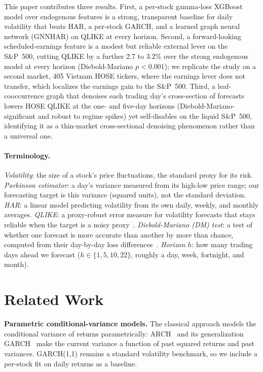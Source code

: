 \documentclass[runningheads]{llncs}
\begin{document}
This paper contributes three results. First, a per-stock gamma-loss XGBoost model over endogenous
features is a strong, transparent baseline for daily volatility that beats HAR, a per-stock
GARCH, and a learned graph neural network (GNNHAR) on QLIKE at every horizon. Second, a forward-looking
scheduled-earnings feature is a modest but reliable external lever on the S\&P~500, cutting QLIKE by a
further 2.7 to 3.2\% over the strong endogenous model at every horizon (Diebold-Mariano $p<0.001$); we
replicate the study on a second market, 405 Vietnam HOSE tickers, where the earnings lever does not
transfer, which localizes the earnings gain to the S\&P~500. Third, a leaf-cooccurrence graph that
denoises each trading day's cross-section of forecasts lowers HOSE QLIKE at the one- and five-day
horizons (Diebold-Mariano-significant and robust to regime spikes) yet self-disables on the liquid
S\&P~500,
identifying it as a thin-market cross-sectional denoising phenomenon rather than a universal one.

\paragraph{Terminology.}
\emph{Volatility}: the size of a stock's price fluctuations, the standard proxy for its risk.
\emph{Parkinson estimator}: a day's variance measured from its high-low price range; our forecasting
target is this variance (squared units), not the standard deviation.
\emph{HAR}: a linear model predicting volatility from its own daily, weekly, and monthly averages.
\emph{QLIKE}: a proxy-robust error measure for volatility forecasts that stays reliable when the
target is a noisy proxy~\cite{patton2011}.
\emph{Diebold-Mariano (DM) test}: a test of whether one forecast is more accurate than another by
more than chance, computed from their day-by-day loss differences~\cite{dm1995}.
\emph{Horizon} $h$: how many trading days ahead we forecast ($h\in\{1,5,10,22\}$, roughly a day, week,
fortnight, and month).

\section{Related Work}
\textbf{Parametric conditional-variance models.} The classical approach models the conditional variance of
returns parametrically: ARCH~\cite{engle1982} and its generalization GARCH~\cite{bollerslev1986} make the
current variance a function of past squared returns and past variances. GARCH(1,1) remains a standard
volatility benchmark, so we include a per-stock fit on daily returns as a baseline.
\end{document}
